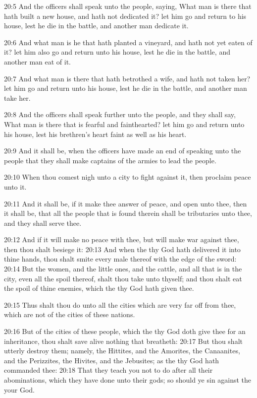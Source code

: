 20:5 And the officers shall speak unto the people, saying, What man is there that hath built a new house, and hath not dedicated it? let him go and return to his house, lest he die in the battle, and another man dedicate it.

20:6 And what man is he that hath planted a vineyard, and hath not yet eaten of it? let him also go and return unto his house, lest he die in the battle, and another man eat of it.

20:7 And what man is there that hath betrothed a wife, and hath not taken her? let him go and return unto his house, lest he die in the battle, and another man take her.

20:8 And the officers shall speak further unto the people, and they shall say, What man is there that is fearful and fainthearted? let him go and return unto his house, lest his brethren's heart faint as well as his heart.

20:9 And it shall be, when the officers have made an end of speaking unto the people that they shall make captains of the armies to lead the people.

20:10 When thou comest nigh unto a city to fight against it, then proclaim peace unto it.

20:11 And it shall be, if it make thee answer of peace, and open unto thee, then it shall be, that all the people that is found therein shall be tributaries unto thee, and they shall serve thee.

20:12 And if it will make no peace with thee, but will make war against thee, then thou shalt besiege it: 20:13 And when the \LORD thy God hath delivered it into thine hands, thou shalt smite every male thereof with the edge of the sword: 20:14 But the women, and the little ones, and the cattle, and all that is in the city, even all the spoil thereof, shalt thou take unto thyself; and thou shalt eat the spoil of thine enemies, which the \LORD thy God hath given thee.

20:15 Thus shalt thou do unto all the cities which are very far off from thee, which are not of the cities of these nations.

20:16 But of the cities of these people, which the \LORD thy God doth give thee for an inheritance, thou shalt save alive nothing that breatheth: 20:17 But thou shalt utterly destroy them; namely, the Hittites, and the Amorites, the Canaanites, and the Perizzites, the Hivites, and the Jebusites; as the \LORD thy God hath commanded thee: 20:18 That they teach you not to do after all their abominations, which they have done unto their gods; so should ye sin against the \LORD your God.

